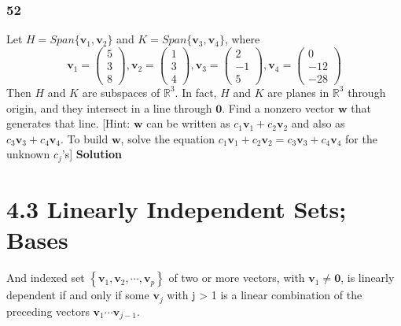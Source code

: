       \subsubsection*{52}
      Let $ H = Span\{\mathbf v_1, \mathbf v_2\} $ and $ K = Span\{\mathbf v_3, \mathbf v_4\}$, where 
      \[
      \mathbf v_1 = \begin{pmatrix}
         5  \\ 
         3  \\ 
         8 
      \end{pmatrix}, 
      \mathbf v_2 = \begin{pmatrix}
         1  \\ 
         3  \\ 
         4 
      \end{pmatrix}, 
      \mathbf v_3 = \begin{pmatrix}
         2  \\ 
         -1  \\ 
         5 
      \end{pmatrix}, 
      \mathbf v_4 = \begin{pmatrix}
         0  \\ 
         -12  \\ 
         -28 
      \end{pmatrix} 
      \]
      Then $ H $ and $ K $ are subspaces of $ \mathbb R^{3} $. In fact, $ H $ and $ K $ are planes in $ \mathbb R^{3} $ through origin, and they intersect in a line through $ \mathbf 0 $. Find a nonzero vector $ \mathbf w $ that generates that line. [Hint: $ \mathbf w $ can be written as $ c_1 \mathbf v_1 + c_2 \mathbf v_2 $ and also as $ c_3 \mathbf v_3 + c_4 \mathbf v_4 $. To build $ \mathbf w $, solve the equation $ c_1 \mathbf v_1 + c_2 \mathbf v_2  = c_3 \mathbf v_3 + c_4 \mathbf v_4  $ for the unknown $ c_j $'s] \newline \newline
      \bf{Solution} \newline \newline 
      
\section*{4.3 Linearly Independent Sets; Bases}
  \begin{theorem}
    And indexed set $ \left\{ \mathbf{v}_1,\mathbf{v}_2,\cdots,\mathbf{v}_p \right\}  $ of two or more vectors, with $ \mathbf{v}_1 \neq  \mathbf{0} $, is linearly dependent if and only if some $ \mathbf{v}_j $
    with j > 1 is a linear combination of the preceding vectors $ \mathbf{v}_1 \cdots \mathbf{v}_{j - 1} $.  \end{theorem}
  
